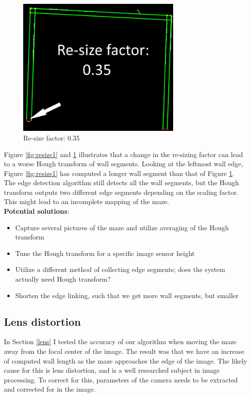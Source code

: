 \begin{figure}[H]
\centering
\includegraphics[width=0.73\textwidth]{fig/resize2}
  \caption{Re-size factor: 0.35}
  \label{fig:resize2}
\end{figure}
Figure \ref{fig:resize1} and \ref{fig:resize2} illustrates that a change in the re-sizing factor can lead to a worse Hough transform of wall segments. Looking at the leftmost wall edge, Figure \ref{fig:resize1} has computed a longer wall segment than that of Figure \ref{fig:resize2}. The edge detection algorithm still detects all the wall segments, but the Hough transform outputs two different edge segments depending on the scaling factor. This might lead to an incomplete mapping of the maze.\\

\textbf{Potential solutions}:
\begin{itemize}
\item Capture several pictures of the maze and utilize averaging of the Hough transform
\item Tune the Hough transform for a specific image sensor height
\item Utilize a different method of collecting edge segments; does the system actually need Hough transform?
\item Shorten the edge linking, such that we get more wall segments, but smaller
\end{itemize}

\subsection{Lens distortion}
In Section \ref{lens} I tested the accuracy of our algorithm when moving the maze away from the focal center of the image. The result was that we have an increase of computed wall length as the maze approaches the edge of the image. The likely cause for this is lens distortion, and is a well researched subject in image processing. To correct for this, parameters of the camera needs to be extracted and corrected for in the image.\\

